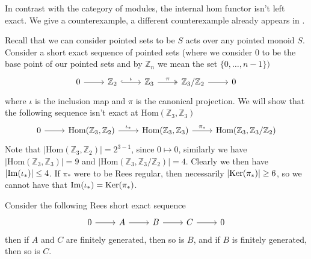 In contrast with the category of modules, the 
internal hom functor isn't left exact. We give a counterexample, a different 
counterexample already appears in \cite{Chen02}.
\begin{example}
    Recall that we can consider pointed sets to be $S$ acts over any pointed monoid $S$. Consider a 
    short exact sequence of pointed sets (where we consider $0$ to be the base point of our pointed sets and by $\mathbb{Z}_n$ we mean the set $\{0,\dots,n-1\})$
    \[\begin{tikzcd}
        0 & {\mathbb{Z}_2} & {\mathbb{Z}_3} & {\mathbb{Z}_3/\mathbb{Z}_2} & 0
        \arrow[from=1-1, to=1-2]
        \arrow["\iota", hook, from=1-2, to=1-3]
        \arrow["\pi", two heads, from=1-3, to=1-4]
        \arrow[from=1-4, to=1-5]
    \end{tikzcd}\]
    where $\iota$ is the inclusion map and $\pi$ is the canonical projection.
    We will show that the following sequence isn't exact at $\text{Hom}(\mathbb{Z}_3,\mathbb{Z}_3)$
    \[\begin{tikzcd}
        0 & {\text{Hom}(\mathbb{Z}_3,\mathbb{Z}_2)} & {\text{Hom}(\mathbb{Z}_3,\mathbb{Z}_3)} & {\text{Hom}(\mathbb{Z}_3,\mathbb{Z}_3/\mathbb{Z}_2)}
        \arrow[from=1-1, to=1-2]
        \arrow["{\iota_*}", from=1-2, to=1-3]
        \arrow["{\pi_*}", from=1-3, to=1-4]
    \end{tikzcd}\]
    Note that $\left|\text{Hom}(\mathbb{Z}_3,\mathbb{Z}_2)\right| = 2^{3-1}$, since $0\mapsto 0$, similarly we have 
    $\left|\text{Hom}(\mathbb{Z}_3,\mathbb{Z}_3) \right| =9$ and $\left|\text{Hom}(\mathbb{Z}_3,\mathbb{Z}_3/\mathbb{Z}_2)\right| = 4$.
    Clearly we then have $\left|\mathrm{Im}(\iota_*)\right|\leq 4$. If $\pi_*$ were to be Rees regular, then necessarily 
    $\left|\mathrm{Ker}(\pi_*)\right| \geq 6$, so we cannot have that $\mathrm{Im}(\iota_*)=\mathrm{Ker}(\pi_*)$.
\end{example}
\begin{proposition}
    Consider the following Rees short exact sequence
    \[\begin{tikzcd}
        0 & A & B & C & 0
        \arrow[from=1-1, to=1-2]
        \arrow[from=1-2, to=1-3]
        \arrow[from=1-3, to=1-4]
        \arrow[from=1-4, to=1-5]
    \end{tikzcd}\]
    then if $A$ and $C$ are finitely generated, then so is $B$, and if $B$ is finitely generated, then so is $C$.
\end{proposition}
